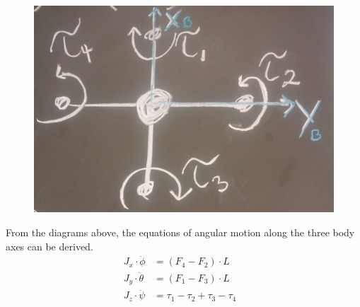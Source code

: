 \begin{minipage}{\linewidth}
\begin{minipage}{0.45\linewidth}
\begin{figure}[H]
			\label{fig:diagramQuad}
		\end{figure}
	\end{minipage}
	\hspace{0.03\linewidth}
	\begin{minipage}{0.45\linewidth}
		\begin{figure}[H] \vspace{16mm}
			\includegraphics[scale=.18]{figures/torques_diagram}
			\centering
			\label{fig:diagramTorque}
		\end{figure}
	\end{minipage}
\end{minipage}


From the diagrams above, the equations of angular motion along the three body axes can be derived.
%
\begin{align}
	J_x\cdot\ddot{\phi}&=(F_4-F_2)\cdot L &\\
	J_y \cdot\ddot{\theta}&=(F_1-F_3)\cdot L &\\
	J_z\cdot\ddot{\psi}&=\tau_1-\tau_2+\tau_3-\tau_4
	\label{eq:AngleEq}
\end{align}

\begin{where}
\end{where}




